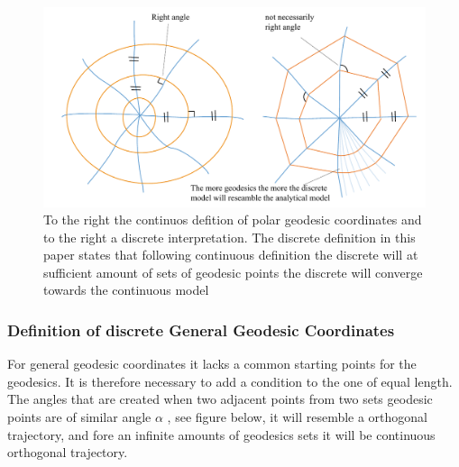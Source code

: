 \begin{figure}[H]
\centering
\includegraphics[width = 1.0\linewidth ]{figure/Method/polargeo.pdf}
\caption{To the right the continuos defition of polar geodesic coordinates and to the right a discrete interpretation. The discrete definition in this paper states that following continuous definition the discrete will at sufficient amount of sets of geodesic points the discrete will converge towards the continuous model}

\end{figure}

\subsubsection{Definition of discrete General Geodesic Coordinates}

For general geodesic coordinates it lacks a common starting points for the geodesics. It is therefore necessary to add a condition to the one of equal length. The angles that are created when two adjacent points from two sets geodesic points are of similar angle $\alpha$ , see figure below, it will resemble a orthogonal trajectory, and fore an infinite amounts of geodesics sets it will be continuous orthogonal trajectory. 

